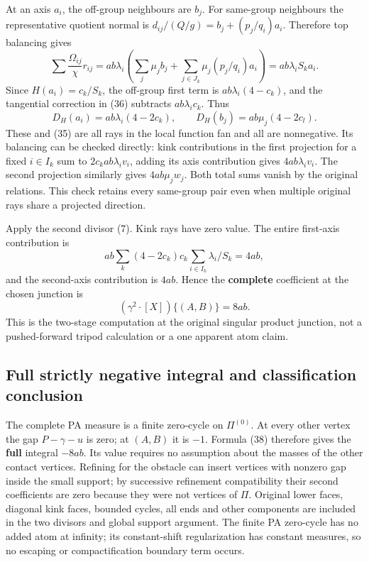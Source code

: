 \documentclass[
  11pt,
]{article}
\begin{document}
At an axis \(a_i\), the off-group neighbours are \(b_j\). For same-group
neighbours the representative quotient normal is
\(d_{ij}/(Q/g)=b_j+(p_j/q_i)a_i\). Therefore top balancing gives \[
 \sum\frac{\Omega_{ij}}{\chi}r_{ij}
       =ab\lambda_i\left(\sum_j\mu_jb_j+
                    \sum_{j\in J_k}\mu_j(p_j/q_i)a_i\right)
       =ab\lambda_i S_k a_i.                               \tag{36}
\] Since \(H(a_i)=c_k/S_k\), the off-group first term is
\(ab\lambda_i(4-c_k)\), and the tangential correction in (36) subtracts
\(ab\lambda_i c_k\). Thus \[
 D_H(a_i)=ab\lambda_i(4-2c_k),\qquad
 D_H(b_j)=ab\mu_j(4-2c_l).                                 \tag{37}
\] These and (35) are all rays in the local function fan and all are
nonnegative. Its balancing can be checked directly: kink contributions
in the first projection for a fixed \(i\in I_k\) sum to
\(2c_kab\lambda_i v_i\), adding its axis contribution gives
\(4ab\lambda_i v_i\). The second projection similarly gives
\(4ab\mu_jw_j\). Both total sums vanish by the original relations. This
check retains every same-group pair even when multiple original rays
share a projected direction.

Apply the second divisor (7). Kink rays have zero value. The entire
first-axis contribution is \[
 ab\sum_k(4-2c_k)c_k\sum_{i\in I_k}\lambda_i/S_k=4ab,
\] and the second-axis contribution is \(4ab\). Hence the
\textbf{complete} coefficient at the chosen junction is \[
                          (\gamma^2\cdot[X])\{(A,B)\}=8ab.              \tag{38}
\] This is the two-stage computation at the original singular product
junction, not a pushed-forward tripod calculation or a one apparent atom
claim.

\subsection{Full strictly negative integral and classification
conclusion}\label{full-strictly-negative-integral-and-classification-conclusion}

The complete PA measure is a finite zero-cycle on \(\Pi^{(0)}\). At
every other vertex the gap \(P-\gamma-u\) is zero; at \((A,B)\) it is
\(-1\). Formula (38) therefore gives the \textbf{full} integral
\(-8ab\). Its value requires no assumption about the masses of the other
contact vertices. Refining for the obstacle can insert vertices with
nonzero gap inside the small support; by successive refinement
compatibility their second coefficients are zero because they were not
vertices of \(\Pi\). Original lower faces, diagonal kink faces, bounded
cycles, all ends and other components are included in the two divisors
and global support argument. The finite PA zero-cycle has no added atom
at infinity; its constant-shift regularization has constant measures, so
no escaping or compactification boundary term occurs.
\end{document}
